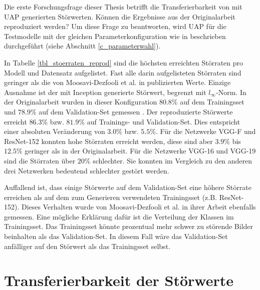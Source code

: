 \documentclass{FFHS_Thesis_Additions/ffhsthesis}
\begin{document}
Die erste Forschungsfrage dieser Thesis betrifft die Transferierbarkeit von mit UAP generierten Störwerten. Können die Ergebnisse aus der Originalarbeit \cite{moosavi-dezfooli_universal_2017-1} reproduziert werden?
Um diese Frage zu beantworten, wird UAP für die Testmodelle mit der gleichen Parameterkonfiguration wie in \cite{moosavi-dezfooli_universal_2017-1} beschrieben durchgeführt (siehe Abschnitt \ref{c_parameterwahl}).

In Tabelle \ref{tbl_stoerraten_reprod} sind die höchsten erreichten Störraten pro Modell und Datensatz aufgelistet. 
Fast alle darin aufgelisteten Störraten sind geringer als die von Moosavi-Dezfooli et al. in \cite{moosavi-dezfooli_universal_2017-1} publizierten Werte. 
Einzige Ausnahme ist der mit Inception generierte Störwert, begrenzt mit $l_\infty$-Norm.
In der Originalarbeit wurden in dieser Konfiguration $80.8\%$ auf dem Trainingsset und $78.9\%$ auf dem Validation-Set gemessen \cite{moosavi-dezfooli_universal_2017-1}.
Der reproduzierte Störwerte erreicht $86.3\%$ bzw. $81.9\%$ auf Trainings- und Validation-Set. Dies entspricht einer absoluten Veränderung von $3.0\%$ bzw. $5.5\%$. Für die Netzwerke VGG-F und ResNet-152 konnten hohe Störraten erreicht werden, diese sind aber $3.9\%$ bis $12.5\%$ geringer als in der Originalarbeit. 
Für die Netzwerke VGG-16 und VGG-19 sind die Störraten über $20\%$ schlechter. 
Sie konnten im Vergleich zu den anderen drei Netzwerken bedeutend schlechter gestört werden. 

\pagebreak

Auffallend ist, dass einige Störwerte auf dem Validation-Set eine höhere Störrate erreichen als auf dem zum Generieren verwendeten Trainingsset (z.B. ResNet-152). Dieses Verhalten wurde von Moosavi-Dezfooli et al. in ihrer Arbeit \cite{moosavi-dezfooli_universal_2017-1} ebenfalls gemessen. Eine mögliche Erklärung dafür ist die Verteilung der Klassen im Trainingsset. Das Trainingsset könnte prozentual mehr schwer zu störende Bilder beinhalten als das Validation-Set. In diesem Fall wäre das Validation-Set anfälliger auf den Störwert als das Trainingsset selbst.

\pagebreak

\section{Transferierbarkeit der Störwerte}
\label{c_resultate_transferierbarkeit}
\end{document}
